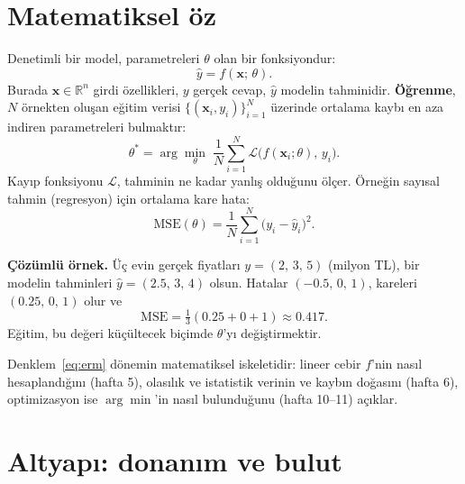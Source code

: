 \documentclass[11pt,a4paper]{article}
\begin{document}
\section{Matematiksel öz}

Denetimli bir model, parametreleri $\theta$ olan bir fonksiyondur:
\begin{equation}
\hat{y} = f(\mathbf{x};\,\theta).
\end{equation}
Burada $\mathbf{x}\in\mathbb{R}^{n}$ girdi özellikleri, $y$ gerçek cevap, $\hat{y}$ modelin tahminidir. \textbf{Öğrenme}, $N$ örnekten oluşan eğitim verisi $\{(\mathbf{x}_i,y_i)\}_{i=1}^{N}$ üzerinde ortalama kaybı en aza indiren parametreleri bulmaktır:
\begin{equation}
\theta^{*} = \arg\min_{\theta}\; \frac{1}{N}\sum_{i=1}^{N} \mathcal{L}\big(f(\mathbf{x}_i;\theta),\, y_i\big).
\label{eq:erm}
\end{equation}
Kayıp fonksiyonu $\mathcal{L}$, tahminin ne kadar yanlış olduğunu ölçer. Örneğin sayısal tahmin (regresyon) için ortalama kare hata:
\begin{equation}
\mathrm{MSE}(\theta) = \frac{1}{N}\sum_{i=1}^{N}\big(y_i - \hat{y}_i\big)^{2}.
\end{equation}

\begin{kutu}
\textbf{Çözümlü örnek.} Üç evin gerçek fiyatları $y=(2,\,3,\,5)$ (milyon TL), bir modelin tahminleri $\hat{y}=(2.5,\,3,\,4)$ olsun. Hatalar $(-0.5,\,0,\,1)$, kareleri $(0.25,\,0,\,1)$ olur ve
\[
\mathrm{MSE} = \tfrac{1}{3}(0.25+0+1) \approx 0.417 .
\]
Eğitim, bu değeri küçültecek biçimde $\theta$'yı değiştirmektir.
\end{kutu}

Denklem~\eqref{eq:erm} dönemin matematiksel iskeletidir: lineer cebir $f$'nin nasıl hesaplandığını (hafta 5), olasılık ve istatistik verinin ve kaybın doğasını (hafta 6), optimizasyon ise $\arg\min$'in nasıl bulunduğunu (hafta 10–11) açıklar.

\section{Altyapı: donanım ve bulut}
\end{document}

